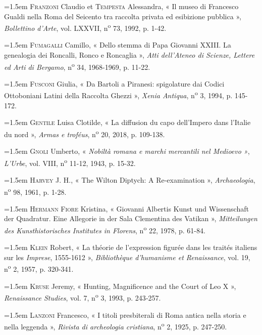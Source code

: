 \documentclass[12pt,twoside,openany]{book}
\newenvironment{PurhBibliography}
  {%
    \par
    \setlength{\parindent}{0pt}%
    \setlength{\leftskip}{0pt}%
  }
  {%
    \par
  }
\begin{document}
\begin{PurhBibliography}
\noindent\hangindent=1.5em \textsc{Franzoni} Claudio et \textsc{Tempesta} Alessandra, « Il museo di Francesco Gualdi nella Roma del Seicento tra raccolta privata ed esibizione pubblica », \textit{Bollettino d’Arte}, vol. \textsc{LXXVII}, n\textsuperscript{o} 73, 1992, p. 1-42.\par
\noindent\hangindent=1.5em \textsc{Fumagalli} Camillo, « Dello stemma di Papa Giovanni \textsc{XXIII}. La genealogia dei Roncalli, Ronco e Roncaglia », \textit{Atti dell’Ateneo di Scienze, Lettere ed Arti di Bergamo}, n\textsuperscript{o} 34, 1968-1969, p. 11-22.\par
\noindent\hangindent=1.5em \textsc{Fusconi} Giulia, « Da Bartoli a Piranesi: spigolature dai Codici Ottoboniani Latini della Raccolta Ghezzi », \textit{Xenia Antiqua}, n\textsuperscript{o} 3, 1994, p. 145-172.\par
\noindent\hangindent=1.5em \textsc{Gentile} Luisa Clotilde, « La diffusion du capo dell'Impero dans l’Italie du nord », \textit{Armas e troféus}, n\textsuperscript{o} 20, 2018, p. 109-138.\par
\noindent\hangindent=1.5em \textsc{Gnoli} Umberto, « \textit{Nobiltà romana e marchi mercantili nel Medioevo »}, \textit{L’Urbe}, vol. \textsc{VIII}, n\textsuperscript{o} 11-12, 1943, p. 15-32.\par
\noindent\hangindent=1.5em \textsc{Harvey} J. H., « The Wilton Diptych: A Re-examination », \textit{Archaeologia}, n\textsuperscript{o} 98, 1961, p. 1-28.\par
\noindent\hangindent=1.5em \textsc{Hermann Fiore} Kristina, « Giovanni Albertis Kunst und Wissenschaft der Quadratur. Eine Allegorie in der Sala Clementina des Vatikan », \textit{Mitteilungen des Kunsthistorisches Institutes in Florens}, n\textsuperscript{o} 22, 1978, p. 61-84.\par
\noindent\hangindent=1.5em \textsc{Klein} Robert, « La théorie de l’expression figurée dans les traités italiens sur les \textit{Imprese}, 1555-1612 », \textit{Bibliothèque d’humanisme et Renaissance}, vol. 19, n\textsuperscript{o} 2, 1957, p. 320-341.\par
\noindent\hangindent=1.5em \textsc{Kruse} Jeremy, « Hunting, Magnificence and the Court of Leo X », \textit{Renaissance Studies}, vol. 7, n\textsuperscript{o} 3, 1993, p. 243‑257.\par
\noindent\hangindent=1.5em \textsc{Lanzoni} Francesco, « I titoli presbiterali di Roma antica nella storia e nella leggenda », \textit{Rivista di archeologia cristiana}, n\textsuperscript{o} 2, 1925, p. 247-250.\par

\end{PurhBibliography}
\end{document}
